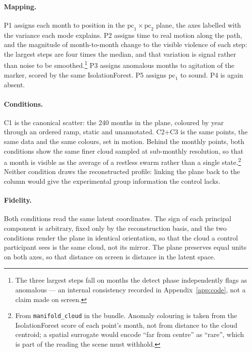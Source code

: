 \paragraph{Mapping.} P1 assigns each month to position in the $\mathrm{pc}_1 \times \mathrm{pc}_2$ plane, the axes labelled with the variance each mode explains. P2 assigns time to real motion along the path, and the magnitude of month-to-month change to the visible violence of each step: the largest steps are four times the median, and that variation is signal rather than noise to be smoothed.\footnote{The three largest steps fall on months the detect phase independently flags as anomalous --- an internal consistency recorded in Appendix~\ref{app:code}, not a claim made on screen.} P3 assigns anomalous months to agitation of the marker, scored by the same IsolationForest. P5 assigns $\mathrm{pc}_1$ to sound. P4 is again absent.
 
\paragraph{Conditions.} C1 is the canonical scatter: the 240 months in the plane, coloured by year through an ordered ramp, static and unannotated. C2+C3 is the same points, the same data and the same colours, set in motion. Behind the monthly points, both conditions show the same finer cloud sampled at sub-monthly resolution, so that a month is visible as the average of a restless swarm rather than a single state.\footnote{From \texttt{manifold\_cloud} in the bundle. Anomaly colouring is taken from the IsolationForest score of each point's month, not from distance to the cloud centroid; a spatial surrogate would encode ``far from centre'' as ``rare'', which is part of the reading the scene must withhold.} Neither condition draws the reconstructed profile: linking the plane back to the column would give the experimental group information the control lacks.
 
\paragraph{Fidelity.} Both conditions read the same latent coordinates. The sign of each principal component is arbitrary, fixed only by the reconstruction basis, and the two conditions render the plane in identical orientation, so that the cloud a control participant sees is the same cloud, not its mirror. The plane preserves equal units on both axes, so that distance on screen is distance in the latent space.

